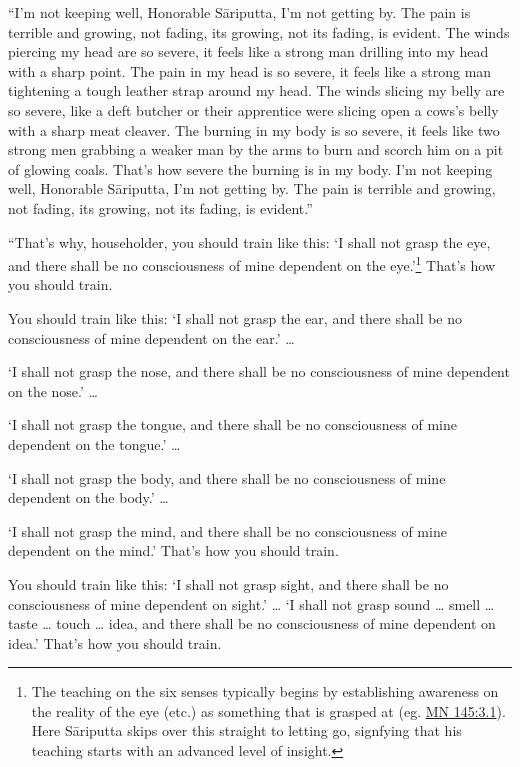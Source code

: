 \documentclass[12pt,openany]{book}%
\begin{document}
“I’m not keeping well, Honorable \textsanskrit{Sāriputta}, I’m not getting by. The pain is terrible and growing, not fading, its growing, not its fading, is evident. The winds piercing my head are so severe, it feels like a strong man drilling into my head with a sharp point. The pain in my head is so severe, it feels like a strong man tightening a tough leather strap around my head. The winds slicing my belly are so severe, like a deft butcher or their apprentice were slicing open a cows’s belly with a sharp meat cleaver. The burning in my body is so severe, it feels like two strong men grabbing a weaker man by the arms to burn and scorch him on a pit of glowing coals. That’s how severe the burning is in my body. I’m not keeping well, Honorable \textsanskrit{Sāriputta}, I’m not getting by. The pain is terrible and growing, not fading, its growing, not its fading, is evident.” 

“That’s why, householder, you should train like this: ‘I shall not grasp the eye, and there shall be no consciousness of mine dependent on the eye.’\footnote{The teaching on the six senses typically begins by establishing awareness on the reality of the eye (etc.) as something that is grasped at (eg. \href{https://suttacentral.net/mn145/en/sujato\#3.1}{MN 145:3.1}). Here \textsanskrit{Sāriputta} skips over this straight to letting go, signfying that his teaching starts with an advanced level of insight. } That’s how you should train. 

You should train like this: ‘I shall not grasp the ear, and there shall be no consciousness of mine dependent on the ear.’ … 

‘I shall not grasp the nose, and there shall be no consciousness of mine dependent on the nose.’ … 

‘I shall not grasp the tongue, and there shall be no consciousness of mine dependent on the tongue.’ … 

‘I shall not grasp the body, and there shall be no consciousness of mine dependent on the body.’ … 

‘I shall not grasp the mind, and there shall be no consciousness of mine dependent on the mind.’ That’s how you should train. 

You should train like this: ‘I shall not grasp sight, and there shall be no consciousness of mine dependent on sight.’ … ‘I shall not grasp sound … smell … taste … touch … idea, and there shall be no consciousness of mine dependent on idea.’ That’s how you should train. 
\end{document}
